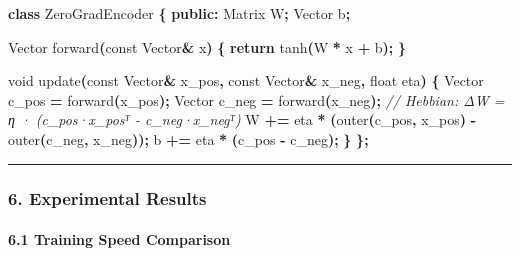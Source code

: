 \documentclass[
  11pt,
  a4paper,
]{article}
\newenvironment{Shaded}{\begin{snugshade}}{\end{snugshade}}
\newcommand{\AttributeTok}[1]{\textcolor[rgb]{0.13,0.29,0.53}{#1}}
\newcommand{\CommentTok}[1]{\textcolor[rgb]{0.56,0.35,0.01}{\textit{#1}}}
\newcommand{\ControlFlowTok}[1]{\textcolor[rgb]{0.13,0.29,0.53}{\textbf{#1}}}
\newcommand{\DataTypeTok}[1]{\textcolor[rgb]{0.13,0.29,0.53}{#1}}
\newcommand{\KeywordTok}[1]{\textcolor[rgb]{0.13,0.29,0.53}{\textbf{#1}}}
\newcommand{\NormalTok}[1]{#1}
\newcommand{\OperatorTok}[1]{\textcolor[rgb]{0.81,0.36,0.00}{\textbf{#1}}}
\begin{document}
\begin{Shaded}
\begin{Highlighting}[]
\KeywordTok{class}\NormalTok{ ZeroGradEncoder }\OperatorTok{\{}
\KeywordTok{public}\OperatorTok{:}
\NormalTok{    Matrix W}\OperatorTok{;}
\NormalTok{    Vector b}\OperatorTok{;}
    
\NormalTok{    Vector forward}\OperatorTok{(}\AttributeTok{const}\NormalTok{ Vector}\OperatorTok{\&}\NormalTok{ x}\OperatorTok{)} \OperatorTok{\{}
        \ControlFlowTok{return}\NormalTok{ tanh}\OperatorTok{(}\NormalTok{W }\OperatorTok{*}\NormalTok{ x }\OperatorTok{+}\NormalTok{ b}\OperatorTok{);}
    \OperatorTok{\}}
    
    \DataTypeTok{void}\NormalTok{ update}\OperatorTok{(}\AttributeTok{const}\NormalTok{ Vector}\OperatorTok{\&}\NormalTok{ x\_pos}\OperatorTok{,} \AttributeTok{const}\NormalTok{ Vector}\OperatorTok{\&}\NormalTok{ x\_neg}\OperatorTok{,} \DataTypeTok{float}\NormalTok{ eta}\OperatorTok{)} \OperatorTok{\{}
\NormalTok{        Vector c\_pos }\OperatorTok{=}\NormalTok{ forward}\OperatorTok{(}\NormalTok{x\_pos}\OperatorTok{);}
\NormalTok{        Vector c\_neg }\OperatorTok{=}\NormalTok{ forward}\OperatorTok{(}\NormalTok{x\_neg}\OperatorTok{);}
        \CommentTok{// Hebbian: ΔW = η · (c\_pos·x\_posᵀ {-} c\_neg·x\_negᵀ)}
\NormalTok{        W }\OperatorTok{+=}\NormalTok{ eta }\OperatorTok{*} \OperatorTok{(}\NormalTok{outer}\OperatorTok{(}\NormalTok{c\_pos}\OperatorTok{,}\NormalTok{ x\_pos}\OperatorTok{)} \OperatorTok{{-}}\NormalTok{ outer}\OperatorTok{(}\NormalTok{c\_neg}\OperatorTok{,}\NormalTok{ x\_neg}\OperatorTok{));}
\NormalTok{        b }\OperatorTok{+=}\NormalTok{ eta }\OperatorTok{*} \OperatorTok{(}\NormalTok{c\_pos }\OperatorTok{{-}}\NormalTok{ c\_neg}\OperatorTok{);}
    \OperatorTok{\}}
\OperatorTok{\};}
\end{Highlighting}
\end{Shaded}

\begin{center}\rule{0.5\linewidth}{0.5pt}\end{center}

\subsubsection{6. Experimental Results}\label{experimental-results-2}

\paragraph{6.1 Training Speed
Comparison}\label{training-speed-comparison}
\end{document}
